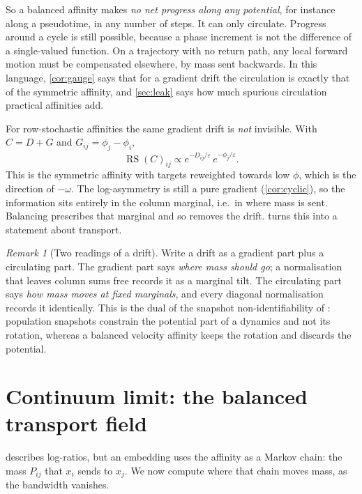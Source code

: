 \documentclass{article}
\theoremstyle{plain}
\theoremstyle{definition}
\theoremstyle{remark}
\newtheorem{remark}[theorem]{Remark}
\newcommand{\eps}{\varepsilon}
\newcommand{\1}{\mathbf{1}}
\newcommand{\RS}{\operatorname{RS}}
\begin{document}
So a balanced affinity makes \emph{no net progress along any potential},
for instance along a pseudotime, in any number of steps. It can only
circulate. Progress around a cycle is still possible, because a phase
increment is not the difference of a single-valued function. On a
trajectory with no return path, any local forward motion must be
compensated elsewhere, by mass sent backwards. In this language,
\cref{cor:gauge} says that for a gradient drift the circulation is exactly
that of the symmetric affinity, and \cref{sec:leak} says how much spurious
circulation practical affinities add.

For row-stochastic affinities the same gradient drift is \emph{not}
invisible. With $C=D+G$ and $G_{ij}=\phi_j-\phi_i$,
\[
  \RS(C)_{ij}\propto e^{-D_{ij}/\eps}\,e^{-\phi_j/\eps}.
\]
This is the symmetric affinity with targets reweighted towards low $\phi$,
which is the direction of $-\omega$. The log-asymmetry is still a pure
gradient (\cref{cor:cyclic}), so the information sits entirely in the
column marginal, i.e.\ in where mass is sent. Balancing prescribes that
marginal and so removes the drift.  turns this into a
statement about transport.

\begin{remark}[Two readings of a drift]
  Write a drift as a gradient part plus a circulating part. The gradient
  part says \emph{where mass should go}; a normalisation that leaves column
  sums free records it as a marginal tilt. The circulating part says
  \emph{how mass moves at fixed marginals}, and every diagonal
  normalisation records it identically. This is the dual of the snapshot
  non-identifiability of \citet{weinreb2018fundamental}: population
  snapshots constrain the potential part of a dynamics and not its
  rotation, whereas a balanced velocity affinity keeps the rotation and
  discards the potential.
\end{remark}

\section{Continuum limit: the balanced transport field}
\label{sec:continuum}

 describes log-ratios, but an embedding uses the affinity
as a Markov chain: the mass $P_{ij}$ that $x_i$ sends to $x_j$. We now
compute where that chain moves mass, as the bandwidth vanishes.
\end{document}
